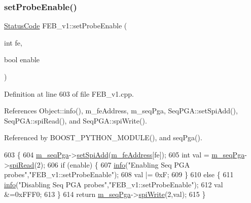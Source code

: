 \subsubsection{\texorpdfstring{set\+Probe\+Enable()}{setProbeEnable()}}
{\footnotesize\ttfamily \hyperlink{classStatusCode}{Status\+Code} F\+E\+B\+\_\+v1\+::set\+Probe\+Enable (\begin{DoxyParamCaption}\item[{int}]{fe,  }\item[{bool}]{enable }\end{DoxyParamCaption})}



Definition at line 603 of file F\+E\+B\+\_\+v1.\+cpp.



References Object\+::info(), m\+\_\+fe\+Address, m\+\_\+seq\+Pga, Seq\+P\+G\+A\+::set\+Spi\+Add(), Seq\+P\+G\+A\+::spi\+Read(), and Seq\+P\+G\+A\+::spi\+Write().



Referenced by B\+O\+O\+S\+T\+\_\+\+P\+Y\+T\+H\+O\+N\+\_\+\+M\+O\+D\+U\+L\+E(), and seq\+Pga().


\begin{DoxyCode}
603                                                      \{
604   \hyperlink{classFEB__v1_a6c7804ac86796f233a8393043adf2e77}{m\_seqPga}->\hyperlink{classSeqPGA_ac998ce3a6d9b5f2e88cc8393f8c1df53}{setSpiAdd}(\hyperlink{classFEB__v1_a4e1945c2d5b434125f375e9d0fc6d99f}{m\_feAddress}[fe]);
605   \textcolor{keywordtype}{int} val = \hyperlink{classFEB__v1_a6c7804ac86796f233a8393043adf2e77}{m\_seqPga}->\hyperlink{classSeqPGA_ab3d0e5e5d4014bc7a92588a76b8713d4}{spiRead}(2);
606   \textcolor{keywordflow}{if} (enable) \{
607     \hyperlink{classObject_a644fd329ea4cb85f54fa6846484b84a8}{info}(\textcolor{stringliteral}{"Enabling Seq PGA probes"},\textcolor{stringliteral}{"FEB\_v1::setProbeEnable"});
608     val |= 0xF;
609   \}
610   \textcolor{keywordflow}{else} \{
611     \hyperlink{classObject_a644fd329ea4cb85f54fa6846484b84a8}{info}(\textcolor{stringliteral}{"Disabling Seq PGA probes"},\textcolor{stringliteral}{"FEB\_v1::setProbeEnable"});
612     val &=0xFFF0;
613   \}
614   \textcolor{keywordflow}{return} \hyperlink{classFEB__v1_a6c7804ac86796f233a8393043adf2e77}{m\_seqPga}->\hyperlink{classSeqPGA_ad4421841ce4ce8b88ad13f63216f0743}{spiWrite}(2,val);
615 \}
\end{DoxyCode}
\mbox{\label{classFEB__v1_a244c472d16ea6778cf6ec93943a060a5}} 
